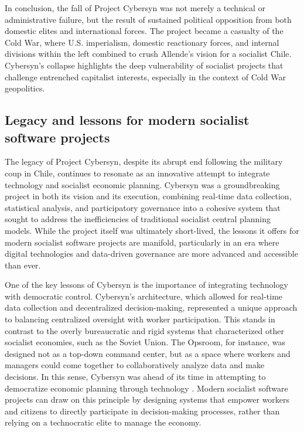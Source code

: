 \begin{refsection}
In conclusion, the fall of Project Cybersyn was not merely a technical or administrative failure, but the result of sustained political opposition from both domestic elites and international forces. The project became a casualty of the Cold War, where U.S. imperialism, domestic reactionary forces, and internal divisions within the left combined to crush Allende's vision for a socialist Chile. Cybersyn’s collapse highlights the deep vulnerability of socialist projects that challenge entrenched capitalist interests, especially in the context of Cold War geopolitics.

\subsection{Legacy and lessons for modern socialist software projects}

The legacy of Project Cybersyn, despite its abrupt end following the military coup in Chile, continues to resonate as an innovative attempt to integrate technology and socialist economic planning. Cybersyn was a groundbreaking project in both its vision and its execution, combining real-time data collection, statistical analysis, and participatory governance into a cohesive system that sought to address the inefficiencies of traditional socialist central planning models. While the project itself was ultimately short-lived, the lessons it offers for modern socialist software projects are manifold, particularly in an era where digital technologies and data-driven governance are more advanced and accessible than ever.

One of the key lessons of Cybersyn is the importance of integrating technology with democratic control. Cybersyn’s architecture, which allowed for real-time data collection and decentralized decision-making, represented a unique approach to balancing centralized oversight with worker participation. This stands in contrast to the overly bureaucratic and rigid systems that characterized other socialist economies, such as the Soviet Union. The Opsroom, for instance, was designed not as a top-down command center, but as a space where workers and managers could come together to collaboratively analyze data and make decisions. In this sense, Cybersyn was ahead of its time in attempting to democratize economic planning through technology \cite[pp.~201-205]{medina2014}. Modern socialist software projects can draw on this principle by designing systems that empower workers and citizens to directly participate in decision-making processes, rather than relying on a technocratic elite to manage the economy.


\end{refsection}
